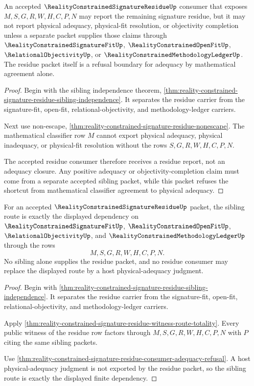 \begin{theorem}
\label{thm:reality-constrained-signature-residue-consumer-adequacy-refusal}
An accepted $\RealityConstrainedSignatureResidueUp$ consumer that exposes $M,S,G,R,W,H,C,P,N$ may report the remaining signature residue, but it may not report physical adequacy, physical-fit resolution, or objectivity completion unless a separate packet supplies those claims through $\RealityConstrainedSignatureFitUp$, $\RealityConstrainedOpenFitUp$, $\RelationalObjectivityUp$, or $\RealityConstrainedMethodologyLedgerUp$. The residue packet itself is a refusal boundary for adequacy by mathematical agreement alone.
\end{theorem}
\begin{proof}
Begin with the sibling independence theorem, \autoref{thm:reality-constrained-signature-residue-sibling-independence}. It separates the residue carrier from the signature-fit, open-fit, relational-objectivity, and methodology-ledger carriers.

Next use non-escape, \autoref{thm:reality-constrained-signature-residue-nonescape}. The mathematical classifier row $M$ cannot export physical adequacy, physical inadequacy, or physical-fit resolution without the rows $S,G,R,W,H,C,P,N$.

The accepted residue consumer therefore receives a residue report, not an adequacy closure. Any positive adequacy or objectivity-completion claim must come from a separate accepted sibling packet, while this packet refuses the shortcut from mathematical classifier agreement to physical adequacy.
\end{proof}

\begin{theorem}
\label{thm:reality-constrained-signature-residue-sibling-route-exactness}
For an accepted $\RealityConstrainedSignatureResidueUp$ packet, the sibling route is exactly the displayed dependency on $\RealityConstrainedSignatureFitUp$, $\RealityConstrainedOpenFitUp$, $\RelationalObjectivityUp$, and $\RealityConstrainedMethodologyLedgerUp$ through the rows
$$
M,S,G,R,W,H,C,P,N.
$$
No sibling alone supplies the residue packet, and no residue consumer may replace the displayed route by a host physical-adequacy judgment.
\end{theorem}
\begin{proof}
Begin with \autoref{thm:reality-constrained-signature-residue-sibling-independence}. It separates the residue carrier from the signature-fit, open-fit, relational-objectivity, and methodology-ledger carriers.

Apply \autoref{thm:reality-constrained-signature-residue-witness-route-totality}. Every public witness of the residue row factors through $M,S,G,R,W,H,C,P,N$ with $P$ citing the same sibling packets.

Use \autoref{thm:reality-constrained-signature-residue-consumer-adequacy-refusal}. A host physical-adequacy judgment is not exported by the residue packet, so the sibling route is exactly the displayed finite dependency.
\end{proof}

